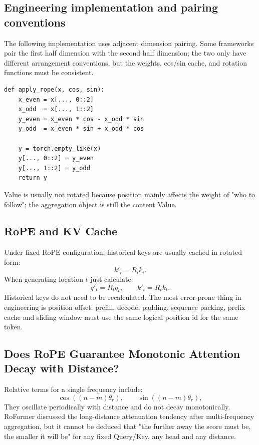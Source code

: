 \documentclass[UTF8,fontset=none,a4paper,10pt]{ctexart}
\begin{document}
\subsection{Engineering implementation and pairing conventions}

The following implementation uses adjacent dimension pairing. Some frameworks pair the first half dimension with the second half dimension; the two only have different arrangement conventions, but the weights, cos/sin cache, and rotation functions must be consistent.

\begin{lstlisting}
def apply_rope(x, cos, sin):
    x_even = x[..., 0::2]
    x_odd  = x[..., 1::2]
    y_even = x_even * cos - x_odd * sin
    y_odd  = x_even * sin + x_odd * cos

    y = torch.empty_like(x)
    y[..., 0::2] = y_even
    y[..., 1::2] = y_odd
    return y
\end{lstlisting}

Value is usually not rotated because position mainly affects the weight of "who to follow"; the aggregation object is still the content Value.

\subsection{RoPE and KV Cache}

Under fixed RoPE configuration, historical keys are usually cached in rotated form:
\begin{equation}
  k'_i=R_i k_i.
  \label{eq:cached-key}
\end{equation}
When generating location $t$ just calculate:
\begin{equation}
  q'_t=R_tq_t,\qquad k'_t=R_tk_t.
  \label{eq:decode-rope}
\end{equation}
Historical keys do not need to be recalculated. The most error-prone thing in engineering is position offset: prefill, decode, padding, sequence packing, prefix cache and sliding window must use the same logical position id for the same token.

\subsection{Does RoPE Guarantee Monotonic Attention Decay with Distance?}

Relative terms for a single frequency include:
\begin{equation}
  \cos((n-m)\theta_r),\qquad \sin((n-m)\theta_r),
  \label{eq:rope-oscillation}
\end{equation}
They oscillate periodically with distance and do not decay monotonically. RoFormer discussed the long-distance attenuation tendency \cite{su2021} after multi-frequency aggregation, but it cannot be deduced that "the further away the score must be, the smaller it will be" for any fixed Query/Key, any head and any distance.
\end{document}
